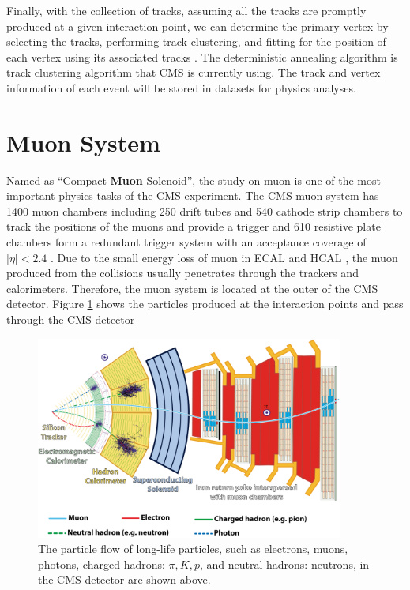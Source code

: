 Finally, with the collection of tracks, assuming all the tracks are promptly produced at a given interaction point, we can determine the primary vertex by selecting the tracks, performing track clustering, and fitting for the position of each vertex using its associated tracks \cite{CMSTrackComp}. The deterministic annealing algorithm \cite{DAAlgo} is track clustering algorithm that CMS is currently using. The track and vertex information of each event will be stored in datasets for physics analyses.

\fi

\section{Muon System}

Named as ``Compact \textbf{Muon} Solenoid'', the study on muon is one of the most important physics tasks of the CMS experiment. The CMS muon system has 1400 muon chambers including 250 drift tubes and 540 cathode strip chambers to track the positions of the muons and provide a trigger and 610 resistive plate chambers form a redundant trigger system with an acceptance coverage of $|\eta| < 2.4$ . Due to the small energy loss of muon in ECAL and HCAL \cite{AlphaTheoEx}, the muon produced from the collisions usually penetrates through the trackers and calorimeters. Therefore, the muon system is located at the outer of the CMS detector. Figure \ref{ParticleFlow} shows the particles produced at the interaction points and pass through the CMS detector

\begin{figure}[hbtp]
\begin{center}
\includegraphics[width=0.90\textwidth]{Figures/Chapter3/CMSParticleFlow.png}
\caption{The particle flow of long-life particles, such as electrons, muons, photons, charged hadrons: $\pi,K,p$, and neutral hadrons: neutrons, in the CMS detector are shown above.}
\label{ParticleFlow}
\end{center}
\end{figure} 

